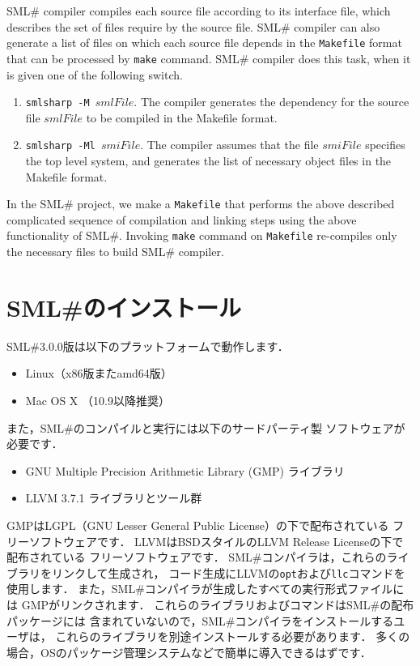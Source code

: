 \documentclass{jbook}
\newif\ifjp
\newcommand{\txt}[2]{#1}
\newcommand{\smlsharp}{SML\#}
\newcommand{\version}{3.0.0}
\begin{document}
	\smlsharp{} compiler compiles each source file according to its
interface file, which describes the set of files require by the source
file.
	\smlsharp{} compiler can also generate a list of files on which
each source file depends in the {\tt Makefile} format that can be
processed by {\tt make} command. 
	\smlsharp{} compiler does this task, when it is given one of the
following switch.

\begin{enumerate}
\item {\tt smlsharp -M $\mathit{smlFile}$}.
	The compiler generates the dependency for the source file
$\mathit{smlFile}$ to be compiled in the Makefile format. 
\item {\tt smlsharp -Ml $\mathit{smiFile}$}.
	The compiler assumes that the file $\mathit{smiFile}$ specifies the
top level system, and generates the list of necessary object files in the
Makefile format. 
\end{enumerate}	

	In the \smlsharp{} project, we make a {\tt Makefile} that
performs the above described complicated sequence of compilation and
linking steps using the above functionality of \smlsharp{}.
	Invoking {\tt make} command on {\tt Makefile} re-compiles only
the necessary files to build \smlsharp{} compiler.
\fi%

\section{
\txt{\smlsharp{}のインストール}
    {Installing \smlsharp{}}}
\label{sec:tutorialInstall}

\ifjp%
	\smlsharp{}\version{}版は以下のプラットフォームで動作します．
\begin{itemize}
\item Linux（x86版またamd64版）
\item Mac OS X （10.9以降推奨）
\end{itemize}

	また，\smlsharp{}のコンパイルと実行には以下のサードパーティ製
ソフトウェアが必要です．
\begin{itemize}
\item GNU Multiple Precision Arithmetic Library (GMP) ライブラリ　
\item LLVM 3.7.1 ライブラリとツール群
\end{itemize}
	GMPはLGPL（GNU Lesser General Public License）の下で配布されている
フリーソフトウェアです．
	LLVMはBSDスタイルのLLVM Release Licenseの下で配布されている
フリーソフトウェアです．
	\smlsharp{}コンパイラは，これらのライブラリをリンクして生成され，
コード生成にLLVMの{\tt opt}および{\tt llc}コマンドを使用します．
	また，\smlsharp{}コンパイラが生成したすべての実行形式ファイルには
GMPがリンクされます．
	これらのライブラリおよびコマンドは\smlsharp{}の配布パッケージには
含まれていないので，\smlsharp{}コンパイラをインストールするユーザは，
これらのライブラリを別途インストールする必要があります．
	多くの場合，OSのパッケージ管理システムなどで簡単に導入できるはずです．
\end{document}
